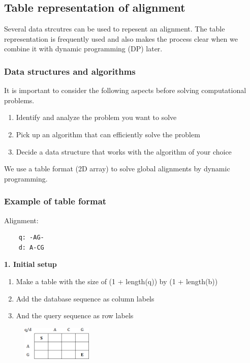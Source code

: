 %
%

%
%
\subsection{Table representation of alignment}
Several data strcutres can be used to repesent an alignment. The table representation is frequently used and also makes the process clear when we combine it with dynamic programming (DP) later.

\subsubsection*{Data structures and algorithms}
It is important to consider the following aspects before solving computational problems.
\begin{enumerate}
\item Identify and analyze the problem you want to solve
\item Pick up an algorithm that can efficiently solve the problem
\item Decide a data structure that works with the algorithm of your choice
\end{enumerate}

\noindent We use a table format (2D array) to solve global alignments by dynamic programming.

\subsubsection*{Example of table format}
Alignment:
\begin{verbatim}
    q: -AG-
    d: A-CG
\end{verbatim}
\medskip 

\noindent \textbf{1. Initial setup}

\begin{enumerate}
\item Make a table with the size of (1 + length(q)) by (1 + length(b))
\item Add the database sequence as column labels
\item And the query sequence as row labels
\end{enumerate}

\begin{figure}[H]
  \centering
      \includegraphics[width=0.3\textwidth]{fig02/alignment_to_table.png}
\end{figure}

